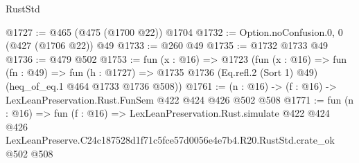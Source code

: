 \begin{lexlean}{RustStd}
\begin{coremodule}
@1727 := @465 (@475 (@1700 @22)) @1704
@1732 := Option.noConfusion.{0, 0} (@427 (@1706 @22)) @49
@1733 := @260 @49
@1735 := @1732 @1733 @49
@1736 := @479 @502
@1753 := fun (x : @16) =>
  @1723
    (fun (x : @16) =>
    fun (fn : @49) =>
    fun (h : @1727) => @1735 @1736 (Eq.refl.{2} (Sort 1) @49) (heq_of_eq.{1} @464 @1733 @1736 @508))
@1761 := (n : @16) -> (f : @16) -> LexLeanPreservation.Rust.FunSem @422 @424 @426 @502 @508
@1771 := fun (n : @16) =>
  fun (f : @16) =>
  LexLeanPreservation.Rust.simulate
    @422
    @424
    @426
    LexLeanPreserve.C24c187528d1f71c5fce57d0056e4e7b4.R20.RustStd.crate_ok
    @502
    @508
\end{coremodule}
\end{lexlean}
